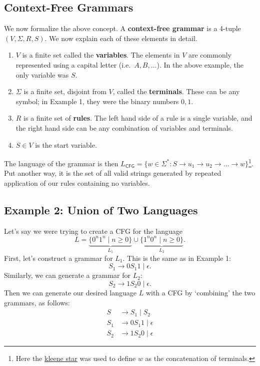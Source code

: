 \documentclass{article}
\begin{document}
\subsection*{Context-Free Grammars}
    We now formalize the above concept. A \textbf{context-free grammar} is a 4-tuple $(V, \Sigma, R, S)$. We now explain each of these elements in detail.
    \begin{enumerate}[label = \arabic*.]
        \item $V$ is a finite set called the \textbf{variables}. The elements in $V$ are commonly represented using a capital letter (i.e.\ $A, B, \dots$). In the above example, the only variable was $S$.
        \item $\Sigma$ is a finite set, disjoint from $V$, called the \textbf{terminals}. These can be any symbol; in Example 1, they were the binary numbers $0, 1$.
        \item $R$ is a finite set of \textbf{rules}. The left hand side of a rule is a single variable, and the right hand side can be any combination of variables and terminals.
        \item $S \in V$ is the start variable.
    \end{enumerate}
    The language of the grammar is then $L_{\textsf{CFG}} = \{w \in \Sigma^{*} : S \rightarrow u_{1} \rightarrow u_{2} \rightarrow \dots \rightarrow w\}$\footnote{Here the \href{https://en.wikipedia.org/wiki/Kleene_star}{kleene star} was used to define $w$ as the concatenation of terminals.}. Put another way, it is the set of all valid strings generated by repeated application of our rules containing no variables.

\subsection*{Example 2: Union of Two Languages}
    Let's say we were trying to create a CFG for the language $$L = \underbrace{\{0^{n}1^{n} \mid n \ge 0\}}_{L_{1}} \cup \underbrace{\{1^{n}0^{n} \mid n \ge 0\}}_{L_{2}}.$$ First, let's construct a grammar for $L_{1}$. This is the same as in Example 1: $$S_{1} \rightarrow 0S_{1}1 \mid \epsilon.$$ Similarly, we can generate a grammar for $L_{2}$: $$S_{2} \rightarrow 1S_{2}0 \mid \epsilon.$$ Then we can generate our desired language $L$ with a CFG by `combining' the two grammars, as follows:
    \begin{align*}
        S &\rightarrow S_{1} \mid S_{2} \\
        S_{1} &\rightarrow 0S_{1}1 \mid \epsilon \\
        S_{2} &\rightarrow 1S_{2}0 \mid \epsilon
    \end{align*}
\end{document}
